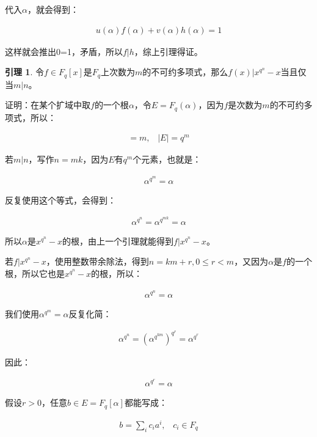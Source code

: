 \documentclass[12pt, a4paper, oneside]{ctexart}
\theoremstyle{definition}
\newtheorem*{lemma}{引理}
\begin{document}
代入$\alpha$，就会得到：

\begin{align*}
u(\alpha)f(\alpha)+v(\alpha)h(\alpha)=1
\end{align*}

这样就会推出0=1，矛盾，所以$f|h$，综上引理得证。

\begin{lemma}
令$f\in F_q[x]$是$F_q$上次数为$m$的不可约多项式，那么$f(x)|x^{q^n}-x$当且仅当$m|n$。
\end{lemma}

证明：在某个扩域中取$f$的一个根$\alpha$，令$E=F_q(\alpha)$，因为$f$是次数为$m$的不可约多项式，所以：

\begin{align*}
[E:F_q]=m,\;\;\; |E|=q^m
\end{align*}

若$m|n$，写作$n=mk$，因为$E$有$q^m$个元素，也就是：

\begin{align*}
\alpha^{q^m}=\alpha
\end{align*}

反复使用这个等式，会得到：

\begin{align*}
\alpha^{q^n}=\alpha^{q^{mk}}=\alpha
\end{align*}

所以$\alpha$是$x^{q^n}-x$的根，由上一个引理就能得到$f|x^{q^n}-x$。

若$f|x^{q^n}-x$，使用整数带余除法，得到$n=km+r,0\leqslant r<m$，又因为$\alpha$是$f$的一个根，所以它也是$x^{q^n}-x$的根，所以：

\begin{align*}
\alpha^{q^n}=\alpha
\end{align*}

我们使用$\alpha^{q^m}=\alpha$反复化简：

\begin{align*}
\alpha^{q^n}=(\alpha^{q^{km}})^{q^r}=\alpha^{q^r}
\end{align*}

因此：

\begin{align*}
\alpha^{q^r}=\alpha
\end{align*}

假设$r>0$，任意$b\in E=F_q[\alpha]$都能写成：

\begin{align*}
b=\sum_{i}c_ia^i,\;\;\; c_i\in F_q
\end{align*}
\end{document}
